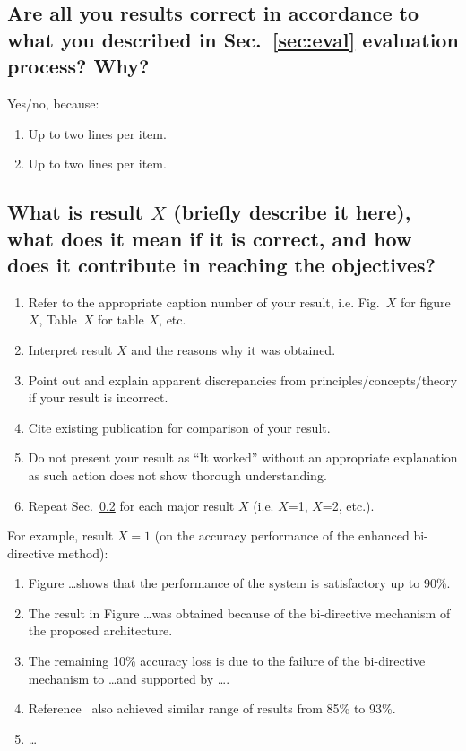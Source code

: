 \subsection{Are all you results correct  in accordance to what you described in Sec.~\ref{sec:eval} evaluation process? Why?} 
Yes/no, because:
\begin{enumerate}
	\item Up to two lines per item.
	\item Up to two lines per item.
\end{enumerate}

\subsection{What is result $X$ (briefly describe it here), what does it mean if it is correct, and how does it contribute in reaching the objectives?}
\label{sec:resn}

\begin{enumerate}		
	\item Refer to the appropriate caption number  of your result, i.e. Fig.~$X$ for figure $X$, Table~$X$ for table $X$, etc.	
	\item Interpret result $X$ and the reasons why it was obtained. 
	
	\item Point out and explain apparent discrepancies from principles/concepts/theory if your result is incorrect.
	
	\item Cite existing publication for comparison of your result.
	
	\item Do not present your result as ``It worked'' without an appropriate explanation as such action does not show thorough understanding.
	
	
	\item Repeat Sec.~\ref{sec:resn} for each major result $X$ (i.e. $X$=1, $X$=2, etc.).		
\end{enumerate}

For example, result $X = 1$ (on the accuracy performance of the enhanced bi-directive method):

\begin{enumerate}
	\item Figure \ldots shows that the performance of the system is satisfactory up to 90\%.
	\item The result in Figure \ldots was obtained because of the bi-directive mechanism of the proposed architecture.
	\item The remaining 10\% accuracy loss is due to the failure of the bi-directive mechanism to \ldots and supported by \ldots.
	\item Reference~\cite{Einstein1905} also achieved similar range of results from 85\% to 93\%.
	\item \ldots
\end{enumerate}

